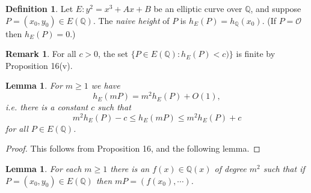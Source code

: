 \documentclass[a4paper]{article}
\newtheorem{lemma}[theorem]{Lemma}
\theoremstyle{definition}
\newtheorem*{definition}{Definition}
\newtheorem*{remark}{Remark}
\renewcommand{\O}{\mathcal{O}}
\newcommand{\Q}{\mathbb{Q}}
\begin{document}
\begin{definition}
    Let $E:y^2=x^3+Ax+B$ be an elliptic curve over $\Q$, and suppose
    $P=(x_0,y_0)\in E(\Q)$. The \emph{naive height} of $P$ is
    $h_E(P)=h_\Q(x_0)$. (If $P=\O$ then $h_E(P)=0$.)
\end{definition}

\begin{remark}
    For all $c>0$, the set $\{P\in E(\Q):h_E(P)<c)\}$ is finite by Proposition
    16(v).
\end{remark}

\begin{lemma}
    For $m\ge1$ we have
    \begin{equation*}
        h_E(mP) = m^2h_E(P) + O(1),
    \end{equation*}
    i.e. there is a constant $c$ such that
    \begin{equation*}
        m^2h_E(P) - c \le h_E(mP) \le m^2h_E(P) + c
    \end{equation*}
    for all $P\in E(\Q)$.
\end{lemma}

\begin{proof}
    This follows from Proposition 16, and the following lemma.
\end{proof}

\begin{lemma}
    For each $m\ge1$ there is an $f(x)\in\Q(x)$ of degree $m^2$ such that if
    $P=(x_0,y_0)\in E(\Q)$ then $mP=(f(x_0),\cdots)$.
\end{lemma}
\end{document}
